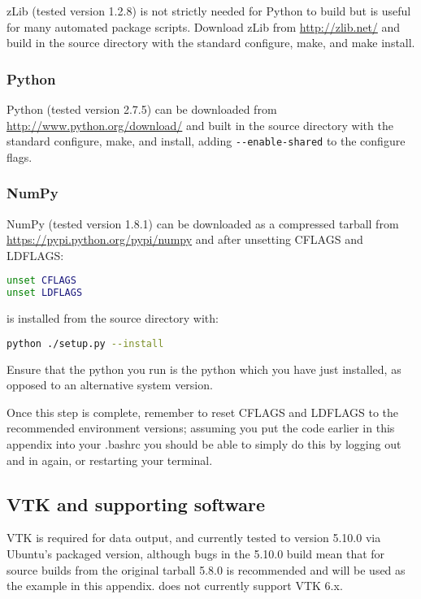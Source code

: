 zLib (tested version 1.2.8) is not strictly needed for Python to build but is
useful for many automated package scripts. Download zLib from 
\url{http://zlib.net/} and build in the source directory with the standard
configure, make, and make install.

\subsubsection{Python}
\label{sec:required_libraries_python_python}

Python (tested version 2.7.5) can be downloaded from
\url{http://www.python.org/download/} and built in the source directory with
the standard configure, make, and install, adding
\lstinline[language=bash]+--enable-shared+ to the configure flags.

\subsubsection{NumPy}
\label{sec:required_libraries_python_numpy}

NumPy (tested version 1.8.1) can be downloaded as a compressed tarball from
\url{https://pypi.python.org/pypi/numpy} and after unsetting CFLAGS and
LDFLAGS:

\begin{lstlisting}[language=bash]
unset CFLAGS
unset LDFLAGS
\end{lstlisting}

is installed from the source directory with:

\begin{lstlisting}[language=bash]
python ./setup.py --install
\end{lstlisting}

Ensure that the python you run is the python which you have just installed, as
opposed to an alternative system version.

Once this step is complete, remember to reset CFLAGS and LDFLAGS to the
recommended environment versions; assuming you put the code earlier in this 
appendix into your .bashrc you should be able to simply do this by logging out
and in again, or restarting your terminal.

\subsection{VTK and supporting software}
\label{sec:required_libraries_vtk}

VTK is required for \fluidity data output, and currently tested to version
5.10.0 via Ubuntu's packaged version, although bugs in the 5.10.0 build mean
that for source builds from the original tarball 5.8.0 is recommended and will
be used as the example in this appendix. \fluidity does not currently support
VTK 6.x.

